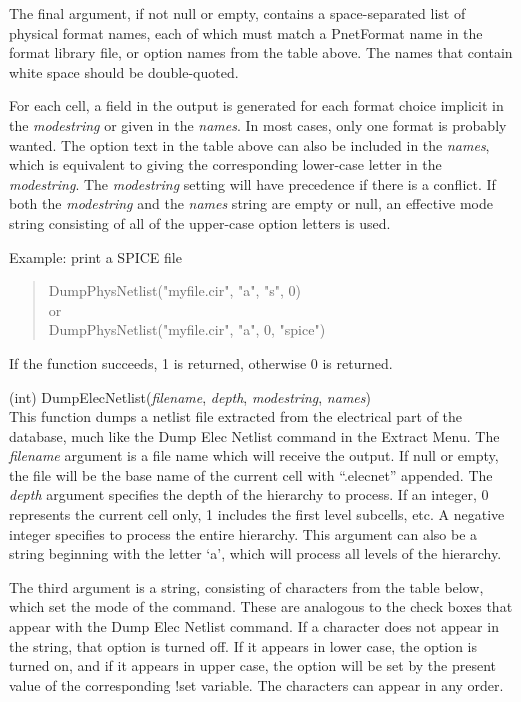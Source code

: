 \begin{description}
The final argument, if not null or empty, contains a space-separated
list of physical format names, each of which must match a {\vt
PnetFormat} name in the format library file, or option names from the
table above.  The names that contain white space should be
double-quoted.

For each cell, a field in the output is generated for each format
choice implicit in the {\it modestring} or given in the {\it names\/}. 
In most cases, only one format is probably wanted.  The option text in
the table above can also be included in the {\it names\/}, which is
equivalent to giving the corresponding lower-case letter in the {\it
modestring\/}.  The {\it modestring} setting will have precedence if
there is a conflict.  If both the {\it modestring} and the {\it names}
string are empty or null, an effective mode string consisting of all
of the upper-case option letters is used.

Example:  print a SPICE file
\begin{quote}
{\vt DumpPhysNetlist("myfile.cir", "a", "s", 0)}\\
or\\
{\vt DumpPhysNetlist("myfile.cir", "a", 0, "spice")}
\end{quote}

If the function succeeds, 1 is returned, otherwise 0 is returned.

\item{(int) \vt DumpElecNetlist({\it filename}, {\it depth},
 {\it modestring\/}, {\it names\/})}\\
This function dumps a netlist file extracted from the electrical part
of the database, much like the {\cb Dump Elec Netlist} command in the
{\cb Extract Menu}.  The {\it filename} argument is a file name which
will receive the output.  If null or empty, the file will be the base
name of the current cell with ``{\vt .elecnet}'' appended.  The {\it
depth} argument specifies the depth of the hierarchy to process.  If
an integer, 0 represents the current cell only, 1 includes the first
level subcells, etc.  A negative integer specifies to process the
entire hierarchy.  This argument can also be a string beginning with
the letter `{\vt a}', which will process all levels of the hierarchy.

The third argument is a string, consisting of characters from the
table below, which set the mode of the command.  These are analogous
to the check boxes that appear with the {\cb Dump Elec Netlist}
command.  If a character does not appear in the string, that option is
turned off.  If it appears in lower case, the option is turned on, and
if it appears in upper case, the option will be set by the present
value of the corresponding {\cb !set} variable.  The characters can
appear in any order.


\end{description}

